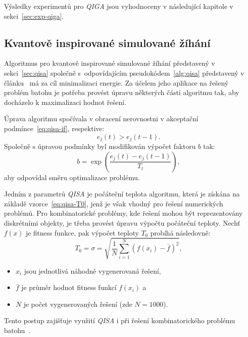 Výsledky experimentů pro \emph{QIGA} jsou vyhodnoceny v následující kapitole v sekci~\ref{sec:exp-qiga}.

\subsection*{Kvantově inspirované simulované žíhání}
Algoritmus pro kvantově inspirované simulované žíhání představený v sekci~\ref{sec:qisa} společně s~odpovídajícím pseudokódem~\ref{alg:qisa} představený v článku~\cite{qisa} má za cíl minimalizaci energie.
Za účelem jeho aplikace na řešený problém batohu je potřeba provést úpravu některých částí algoritmu tak, aby docházelo k maximalizaci hodnot řešení.

Úprava algoritmu spočívala v obracení nerovnostni v akceptační podmínce~\ref{eq:qisa-if}, respektive:
\begin{equation*}
    e_j\left(t\right) > e_j\left(t-1\right).
\end{equation*}
Společně s úpravou podmínky byl modifikován výpočet faktoru $b$ tak:
\begin{equation*}
    b = \exp\left(\frac{e_j\left(t\right) - e_j\left(t-1\right)}{T_t}\right),
\end{equation*}
aby odpovídal směru optimalizace problému. 

Jedním z parametrů \emph{QISA} je počáteční teplota algoritmu, která je získána na základě vzorce~\ref{eq:qisa-T0}, jenž je však vhodný pro řešení numerických problémů. 
Pro kombinatorické problémy, kde řešení mohou být reprezentovány diskrétními objekty, je třeba provést úpravu výpočtu počáteční teploty. 
Nechť $f\left(x\right)$ je fitness funkce, pak výpočet teploty $T_0$ probíhá následovně:
\begin{equation}\label{eq:qisa-std}
    T_0 = \sigma = \sqrt{\frac{1}{N}\sum_{i=1}^{N}\left( f\left(x_i\right) - \bar{f}\right)^2},
\end{equation}
\begin{itemize}
    \item $x_i$ jsou jednotlivá náhodně vygenerovaná řešení,
    \item $\bar{f}$ je průměr hodnot fitness funkcí $f\left(x_i\right)$ a
    \item $N$ je počet vygenerovaných řešení (zde $N=1000$).
\end{itemize}
Tento postup zajišťuje využití \emph{QISA} i při řešení kombinatorického problému batohu~\cite{qisa,FundamentalsOfProbability}. 

